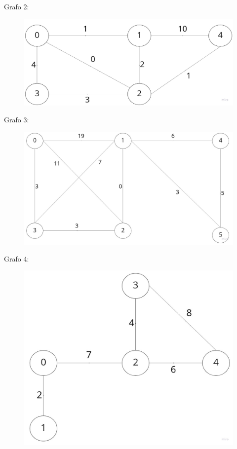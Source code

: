 \documentclass[12pt]{article}
\begin{document}
Grafo 2:


\begin{figure}[ht]
    \centering
    \includegraphics[scale=0.2]{grafo2.jpg}
\end{figure}

\newpage


Grafo 3:


\begin{figure}[ht]
    \centering
    \includegraphics[scale=0.2]{grafo3.jpg}
\end{figure}


Grafo 4:


\begin{figure}[ht]
    \centering
    \includegraphics[scale=0.2]{grafo4.jpg}
\end{figure}
\end{document}
